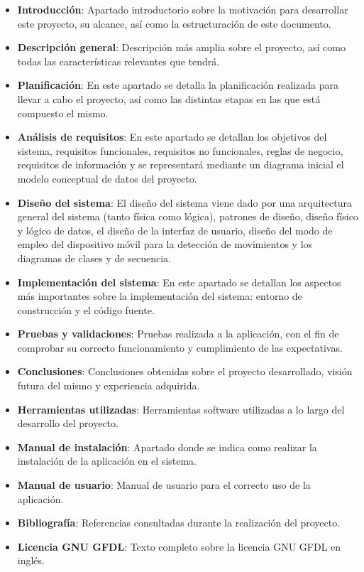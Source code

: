 \begin{itemize}
\item \textbf{Introducción}: Apartado introductorio sobre la motivación para desarrollar este proyecto, su alcance, así como la estructuración de este documento.
\item \textbf{Descripción general}: Descripción más amplia sobre el proyecto, así como todas las características relevantes que tendrá.
\item \textbf{Planificación}: En este apartado se detalla la planificación realizada para llevar a cabo el proyecto, así como las distintas etapas en las que está compuesto el mismo.
\item \textbf{Análisis de requisitos}: En este apartado se detallan los objetivos del sistema, requisitos funcionales, requisitos no funcionales, reglas de negocio, requisitos de información y se representará mediante un diagrama inicial el modelo conceptual de datos del proyecto.
\item \textbf{Diseño del sistema}: El diseño del sistema viene dado por una arquitectura general del sistema (tanto física como lógica), patrones de diseño, diseño físico y lógico de datos, el diseño de la interfaz de usuario, diseño del modo de empleo del dispositivo móvil para la detección de movimientos y los diagramas de clases y de secuencia.
\item \textbf{Implementación del sistema}: En este apartado se detallan los aspectos más importantes sobre la implementación del sistema: entorno de construcción y el código fuente.
\item \textbf{Pruebas y validaciones}: Pruebas realizada a la aplicación, con el fin de comprobar su correcto funcionamiento y cumplimiento de las expectativas.
\item \textbf{Conclusiones}: Conclusiones obtenidas sobre el proyecto desarrollado, visión futura del mismo y experiencia adquirida.
\item \textbf{Herramientas utilizadas}: Herramientas software utilizadas a lo largo del desarrollo del proyecto.
\item \textbf{Manual de instalación}: Apartado donde se indica como realizar la instalación de la aplicación en el sistema.
\item \textbf{Manual de usuario}: Manual de usuario para el correcto uso de la aplicación.
\item \textbf{Bibliografía}: Referencias consultadas durante la realización del proyecto.
\item \textbf{Licencia GNU GFDL}: Texto completo sobre la licencia GNU GFDL en inglés.
\end{itemize}

